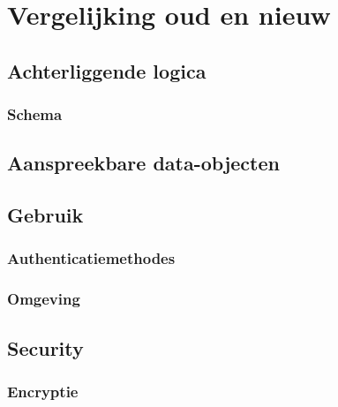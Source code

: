 
\chapter{Vergelijking oud en nieuw}%
\label{ch:vergelijking}


\lipsum[76-80]

\section{Achterliggende logica}

% 

\subsection{Schema}


\subsection{}

\lipsum[76-80]

\section{Aanspreekbare data-objecten}



\lipsum[76-80]

\section{Gebruik}

\subsection{Authenticatiemethodes}

\subsection{Omgeving}


\lipsum[76-80]

\section{Security}

\subsection{Encryptie}


\lipsum[76-80]